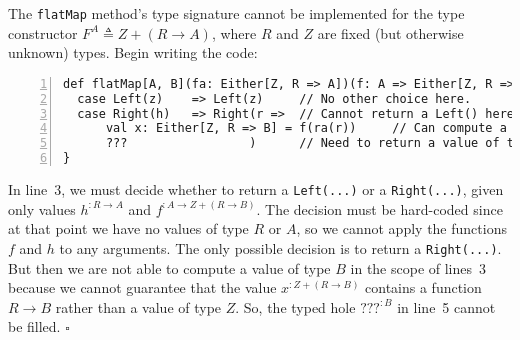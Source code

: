The \lstinline!flatMap! method\textsf{'}s type signature cannot be implemented
for the type constructor $F^{A}\triangleq Z+\left(R\rightarrow A\right)$,
where $R$ and $Z$ are fixed (but otherwise unknown) types. Begin
writing the code:
\begin{lstlisting}[numbers=left]
def flatMap[A, B](fa: Either[Z, R => A])(f: A => Either[Z, R => B]): Either[Z, R => B] = fa match {
  case Left(z)    => Left(z)     // No other choice here.
  case Right(h)   => Right(r =>  // Cannot return a Left() here, since we have no values of type Z.
      val x: Either[Z, R => B] = f(ra(r))     // Can compute a value `x` of type Either[Z, R => B].
      ???                 )      // Need to return a value of type B here, using only r, ra, and f.
}
\end{lstlisting}
In line~3, we must decide whether to return a \lstinline!Left(...)!
or a \lstinline!Right(...)!, given only values $h^{:R\rightarrow A}$
and $f^{:A\rightarrow Z+\left(R\rightarrow B\right)}$. The decision
must be hard-coded since at that point we have no values of type $R$
or $A$, so we cannot apply the functions $f$ and $h$ to any arguments.
The only possible decision is to return a \lstinline!Right(...)!.
But then we are not able to compute a value of type $B$ in the scope
of lines~3 because we cannot guarantee that the value
$x^{:Z+\left(R\rightarrow B\right)}$ contains a function $R\rightarrow B$
rather than a value of type $Z$. So, the typed hole $\text{???}^{:B}$
in line~5 cannot be filled. $\square$

